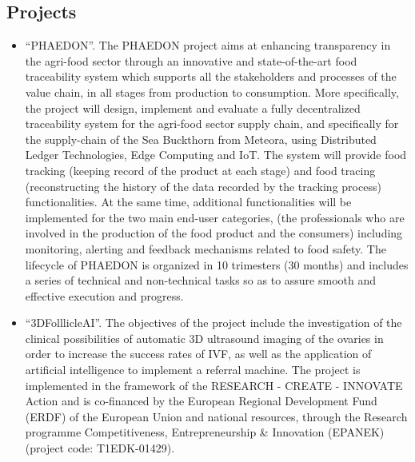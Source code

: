 \documentclass[a4paper,oneside,10pt]{article}
\begin{document}
\subsection*{Projects}

\begin{itemize}

\item \begin{sloppypar}
``PHAEDON''. The PHAEDON project aims at enhancing transparency in the agri-food sector through an innovative and state-of-the-art food traceability system which supports all the stakeholders and processes of the value chain, in all stages from production to consumption. More specifically, the project will design, implement and evaluate a fully decentralized traceability system for the agri-food sector supply chain, and specifically for the supply-chain of the Sea Buckthorn from Meteora, using Distributed Ledger Technologies, Edge Computing and IoT. The system will provide food tracking (keeping record of the product at each stage) and food tracing (reconstructing the history of the data recorded by the tracking process) functionalities. At the same time, additional functionalities will be implemented for the two main end-user categories, (the professionals who are involved in the production of the food product and the consumers) including monitoring, alerting and feedback mechanisms related to food safety. The lifecycle of PHAEDON is organized in 10 trimesters (30 months) and includes a series of technical and non-technical tasks so as to assure smooth and effective execution and progress.

\end{sloppypar}

\item \begin{sloppypar}
``3DFolllicleAI''. The objectives of the project include the investigation of the clinical possibilities of automatic 3D ultrasound imaging of the ovaries in order to increase the success rates of IVF, as well as the application of artificial intelligence to implement a referral machine. The project is implemented in the framework of the RESEARCH - CREATE - INNOVATE Action and is co-financed by the European Regional Development Fund (ERDF) of the European Union and national resources, through the Research programme Competitiveness, Entrepreneurship \& Innovation (EPANEK) (project code: T1EDK-01429).

\end{sloppypar}


\end{itemize}
\end{document}
